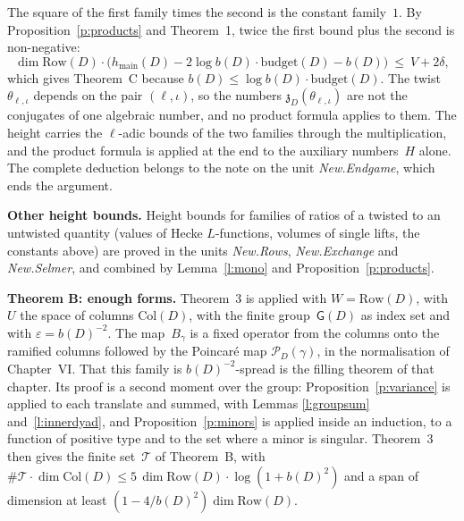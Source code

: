 \documentclass[11pt,a4paper]{article}
\newcommand{\m}[1]{\mbox{$#1$}}        %
\newcommand{\subhead}[1]{\par\addvspace{9pt plus 2pt}\Needspace{4\baselineskip}\noindent\textbf{#1}\enspace\ignorespaces}
\theoremstyle{plainx}
\theoremstyle{uprightx}
\newcommand{\Ts}{\mathcal{T}}
\newcommand{\Row}{\mathrm{Row}}
\newcommand{\Col}{\mathrm{Col}}
\newcommand{\budget}{\mathrm{budget}}
\newcommand{\hmain}{h_{\mathrm{main}}}
\begin{document}
\begin{center}
\end{center}

The square of the first family times the second is the constant family~$1$. By
Proposition~\ref{p:products} and Theorem~1, twice the first bound plus the second is non-negative:
\[\dim\Row(D)\cdot\bigl(\hmain(D)-2\log b(D)\cdot\budget(D)-b(D)\bigr)\ \le\ V+2\delta,\]
which gives Theorem~C because \m{b(D)\le\log b(D)\cdot\budget(D)}. The twist $\theta_{\ell,\iota}$ depends on the pair
$(\ell,\iota)$, so the numbers $\mathfrak{z}_D(\theta_{\ell,\iota})$ are not the conjugates of one algebraic number,
and no product formula applies to them. The height carries the $\ell$-adic bounds of the two families through the
multiplication, and the product formula is applied at the end to the auxiliary numbers~$H$ alone. The complete
deduction belongs to the note on the unit \emph{New.Endgame}, which ends the argument.

\subhead{Other height bounds.} Height bounds for families of ratios of a twisted to an untwisted quantity
(values of Hecke $L$-functions, volumes of single lifts, the constants above) are proved in the units
\emph{New.Rows}, \emph{New.Exchange} and \emph{New.Selmer}, and combined by Lemma~\ref{l:mono} and
Proposition~\ref{p:products}.

\subhead{Theorem B: enough forms.} Theorem~3 is applied with \m{W=\Row(D)}, with $U$ the space of columns
$\Col(D)$, with the finite group~$\mathsf{G}(D)$ as index set and with \m{\varepsilon=b(D)^{-2}}. The map~$B_\gamma$ is
a fixed operator from the columns onto the ramified columns followed by the Poincaré map
\m{\mathcal{P}_D(\gamma)}, in the normalisation of Chapter~VI. That this family is $b(D)^{-2}$-spread is the filling
theorem of that chapter. Its proof is a second moment over the group: Proposition~\ref{p:variance} is applied to
each translate and summed, with Lemmas \ref{l:groupsum} and~\ref{l:innerdyad}, and Proposition~\ref{p:minors} is
applied inside an induction, to a function of positive type and to the set where a minor is singular. Theorem~3
then gives the finite set~$\Ts$ of Theorem~B, with \m{\#\Ts\cdot\dim\Col(D)\le5\,\dim\Row(D)\cdot\log(1+b(D)^2)} and a
span of dimension at least \m{(1-4/b(D)^2)\dim\Row(D)}.
\end{document}
